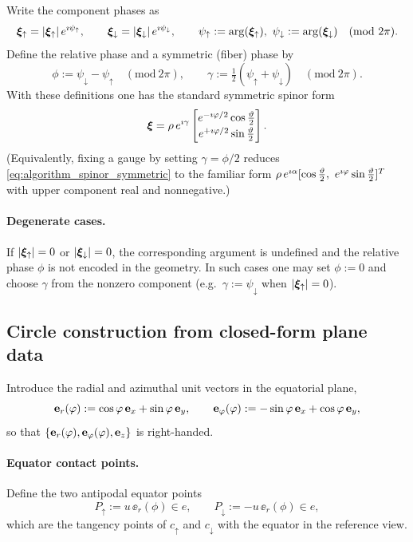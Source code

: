 Write the component phases as
\[
\spu = |\spu|\,e^{\iu\psi_\uparrow},\qquad
\spd = |\spd|\,e^{\iu\psi_\downarrow},
\qquad
\psi_\uparrow:=\arg(\spu),\ \psi_\downarrow:=\arg(\spd)\quad(\mathrm{mod}\ 2\pi).
\]
Define the relative phase and a symmetric (fiber) phase by
\begin{equation}
\label{eq:algorithm_phase_defs}
\phi := \psi_\downarrow-\psi_\uparrow\quad(\mathrm{mod}\ 2\pi),
\qquad
\gamma := \tfrac12(\psi_\uparrow+\psi_\downarrow)\quad(\mathrm{mod}\ 2\pi).
\end{equation}
With these definitions one has the standard symmetric spinor form
\begin{equation}
\label{eq:algorithm_spinor_symmetric}
\bm{\xi}
=
\rho\,e^{\imath\gamma}
\begin{bmatrix}
e^{-\imath\varphi/2}\cos\tfrac{\vartheta}{2}\\[2pt]
e^{+\imath\varphi/2}\sin\tfrac{\vartheta}{2}
\end{bmatrix}.
\end{equation}
(Equivalently, fixing a gauge by setting $\gamma=\phi/2$ reduces \eqref{eq:algorithm_spinor_symmetric} to the familiar form
$\rho\,e^{\iu\alpha}[\cos\thetaT,\ e^{\iu\phi}\sin\thetaT]^T$ with upper component real and nonnegative.)

\paragraph{Degenerate cases.}
If $|\bm{\xi}_\uparrow|=0$ or $|\bm{\xi}_\downarrow|=0$, the corresponding argument is undefined and the relative phase $\phi$ is not encoded in the geometry. In such cases one may set $\phi:=0$ and choose $\gamma$ from the nonzero component (e.g.\ $\gamma:=\psi_\downarrow$ when $|\bm{\xi}_\uparrow|=0$).

\subsection{Circle construction from closed-form plane data}
Introduce the radial and azimuthal unit vectors in the equatorial plane,
\begin{equation}
\mathbf{e}_r(\varphi):=\cos\varphi\,\mathbf{e}_{x}+\sin\varphi\,\mathbf{e}_{y},
\qquad
\mathbf{e}_\varphi(\varphi):=-\sin\varphi\,\mathbf{e}_{x}+\cos\varphi\,\mathbf{e}_{y},
\end{equation}
so that $\{\mathbf{e}_r(\varphi),\mathbf{e}_\varphi(\varphi),\mathbf{e}_{z}\}$ is right-handed.

\paragraph{Equator contact points.}
Define the two antipodal equator points
\begin{equation}
P_\uparrow := u\,\ee_r(\phi)\in e,
\qquad
P_\downarrow := -u\,\ee_r(\phi)\in e,
\end{equation}
which are the tangency points of $c_\uparrow$ and $c_\downarrow$ with the equator in the reference view.

